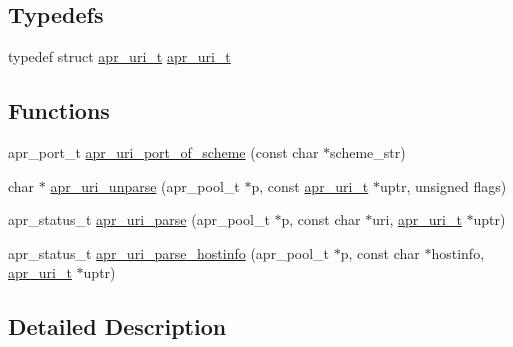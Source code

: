 \subsection*{Typedefs}
\begin{DoxyCompactItemize}
\item 
typedef struct \hyperlink{structapr__uri__t}{apr\-\_\-uri\-\_\-t} \hyperlink{group___a_p_r___util___u_r_i_ga44e5978712bd6ff4fb65314346c01392}{apr\-\_\-uri\-\_\-t}
\end{DoxyCompactItemize}
\subsection*{Functions}
\begin{DoxyCompactItemize}
\item 
apr\-\_\-port\-\_\-t \hyperlink{group___a_p_r___util___u_r_i_gad3b7b49b802a674badfb3322c31662c7}{apr\-\_\-uri\-\_\-port\-\_\-of\-\_\-scheme} (const char $\ast$scheme\-\_\-str)
\item 
char $\ast$ \hyperlink{group___a_p_r___util___u_r_i_ga78b4562bbe4225a0d3087543690394a0}{apr\-\_\-uri\-\_\-unparse} (apr\-\_\-pool\-\_\-t $\ast$p, const \hyperlink{structapr__uri__t}{apr\-\_\-uri\-\_\-t} $\ast$uptr, unsigned flags)
\item 
apr\-\_\-status\-\_\-t \hyperlink{group___a_p_r___util___u_r_i_gabbef816426a66595caae8b60e92ee43c}{apr\-\_\-uri\-\_\-parse} (apr\-\_\-pool\-\_\-t $\ast$p, const char $\ast$uri, \hyperlink{structapr__uri__t}{apr\-\_\-uri\-\_\-t} $\ast$uptr)
\item 
apr\-\_\-status\-\_\-t \hyperlink{group___a_p_r___util___u_r_i_gab3028922e6d1d1e038062bc5b0270f31}{apr\-\_\-uri\-\_\-parse\-\_\-hostinfo} (apr\-\_\-pool\-\_\-t $\ast$p, const char $\ast$hostinfo, \hyperlink{structapr__uri__t}{apr\-\_\-uri\-\_\-t} $\ast$uptr)
\end{DoxyCompactItemize}


\subsection{Detailed Description}


